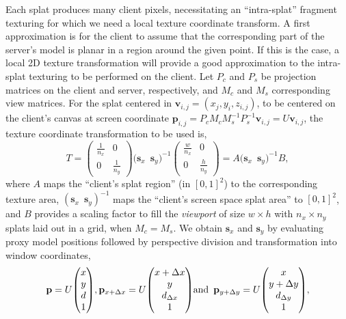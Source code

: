 \documentclass[10pt,conference,compsocconf]{IEEEtran}
\newcommand{\pv}{\mathbf{p}}
\newcommand{\sv}{\mathbf{s}}
\newcommand{\vv}{\mathbf{v}}
\begin{document}
Each splat produces many client pixels, necessitating an ``intra-splat''
fragment texturing for which we need a local texture coordinate transform.
A first approximation is for the client to assume that the corresponding part of
the server's model is planar in a region around the given point. If this is the
case, a local 2D texture transformation will provide a good approximation to the
intra-splat texturing to be performed on the client. Let $P_c$ and $P_s$ be
projection matrices on the client and server, respectively, and $M_c$ and $M_s$
corresponding view matrices. For the splat centered in $\vv_{i, j} = (x_j, y_i,
z_{i, j})$, to be centered on the client's canvas at screen coordinate $\pv_{i,
j} = P_c M_c M_s^{-1} P_s^{-1}\vv_{i, j} = U\vv_{i, j}$, the texture coordinate
transformation to be used is,
\[
  T =
  \begin{pmatrix}
    \frac{1}{n_x} & 0 \\
    0 & \frac{1}{n_y}
  \end{pmatrix}
  \Big( \sv_x \, \, \, \sv_y \Big)^{-1}
  \begin{pmatrix} 
    \frac{w}{n_x} & 0 \\
     0 & \frac{h}{n_y}
  \end{pmatrix}
   =
  A
  \Big( \sv_x \, \, \, \sv_y \Big)^{-1}
  B,
\]
where $A$ maps the ``client's splat region'' (in $[0, 1]^2$) to the
corresponding texture area, $(\sv_{x} \, \, \, \sv_{y})^{-1}$ maps the
``client's screen space splat area'' to $[0, 1]^2$, and $B$ provides a scaling
factor to fill the {\em viewport} of size $w \times h$ with $n_x \times n_y$
splats laid out in a grid, when $M_c=M_s$.
%
%
We obtain $\sv_{x}$ and $\sv_{y}$ by evaluating proxy model positions followed by 
perspective division and transformation into window coordinates,
\[
  \pv =
  U { \small \begin{pmatrix} x \\ y \\ d \\ 1 \end{pmatrix} },
  \pv_{x+\Delta x} =
  U { \small \begin{pmatrix} x+\Delta x \\ y \\ d_{\Delta x} \\ 1 \end{pmatrix} }
  \text{and}\, \, \, 
  \pv_{y+\Delta y} =
  U { \small \begin{pmatrix} x \\ y+\Delta y \\ d_{\Delta y} \\ 1 \end{pmatrix} },
\]
\end{document}
